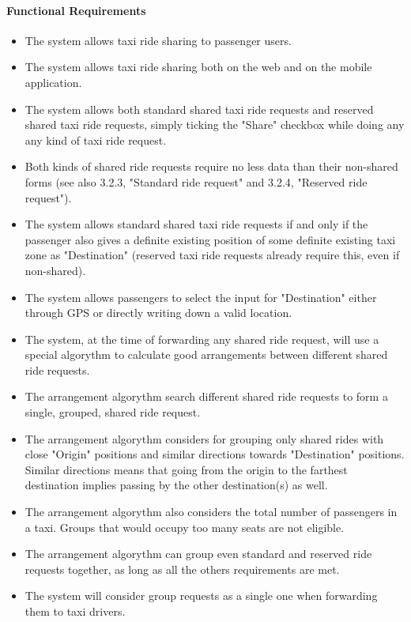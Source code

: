 	\paragraph{Functional Requirements}
		\begin{itemize}
			\item The system allows taxi ride sharing to passenger users.
			\item The system allows taxi ride sharing both on the web and on the mobile application.
			\item The system allows both standard shared taxi ride requests and reserved shared taxi ride requests, simply ticking the "Share" checkbox while doing any any kind of taxi ride request.
			\item Both kinds of shared ride requests require no less data than their non-shared forms (see also 3.2.3, "Standard ride request" and 3.2.4, "Reserved ride request").
			\item The system allows standard shared taxi ride requests if and only if the passenger also gives a definite existing position of some definite existing taxi zone as "Destination" (reserved taxi ride requests already require this, even if non-shared).
			\item The system allows passengers to select the input for "Destination" either through GPS or directly writing down a valid location.
			\item The system, at the time of forwarding any shared ride request, will use a special algorythm to calculate good arrangements between different shared ride requests.
			\item The arrangement algorythm search different shared ride requests to form a single, grouped, shared ride request.
			\item The arrangement algorythm considers for grouping only shared rides with close "Origin" positions and similar directions towards "Destination" positions. Similar directions means that going from the origin to the farthest destination implies passing by the other destination(s) as well.
			\item The arrangement algorythm also considers the total number of passengers in a taxi. Groups that would occupy too many seats are not eligible.
			\item The arrangement algorythm can group even standard and reserved ride requests together, as long as all the others requirements are met.
			\item The system will consider group requests as a single one when forwarding them to taxi drivers.

\end{itemize}
